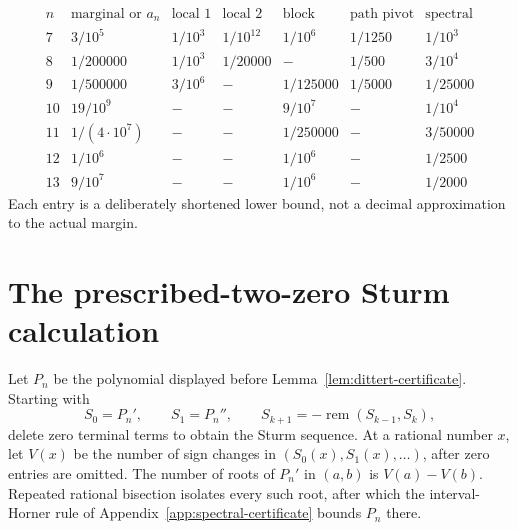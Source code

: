 \documentclass[10pt,a4paper]{amsart}
\theoremstyle{definition}
\theoremstyle{remark}
\newenvironment{exacttable}
  {\begingroup\small
   \setlength{\arraycolsep}{4pt}%
   \renewcommand{\arraystretch}{1.12}}
  {\endgroup}
\begin{document}
\begin{exacttable}
\[
\begin{array}{c|c|c|c|c|c|c}
n&\text{marginal or }a_n&\text{local 1}&\text{local 2}
 &\text{block}&\text{path pivot}&\text{spectral}\\ \hline
7&3/10^5&1/10^3&1/10^{12}&1/10^6&1/1250&1/10^3\\
8&1/200000&1/10^3&1/20000&-&1/500&3/10^4\\
9&1/500000&3/10^6&-&1/125000&1/5000&1/25000\\
10&19/10^9&-&-&9/10^7&-&1/10^4\\
11&1/(4\cdot10^7)&-&-&1/250000&-&3/50000\\
12&1/10^6&-&-&1/10^6&-&1/2500\\
13&9/10^7&-&-&1/10^6&-&1/2000
\end{array}
\tag{A.1}
\]
\end{exacttable}
Each entry is a deliberately shortened lower bound, not a decimal
approximation to the actual margin.

\section{The prescribed-two-zero Sturm calculation}
\label{app:sturm-certificate}

Let \(P_n\) be the polynomial displayed before
Lemma~\ref{lem:dittert-certificate}.  Starting with
\[
 S_0=P_n',\qquad S_1=P_n'',\qquad
 S_{k+1}=-\operatorname{rem}(S_{k-1},S_k),
\]
delete zero terminal terms to obtain the Sturm sequence.  At a rational
number \(x\), let \(V(x)\) be the number of sign changes in
\((S_0(x),S_1(x),\ldots)\), after zero entries are omitted.  The number of
roots of \(P_n'\) in \((a,b)\) is \(V(a)-V(b)\).  Repeated rational
bisection isolates every such root, after which the interval-Horner rule
of Appendix~\ref{app:spectral-certificate} bounds \(P_n\) there.
\end{document}
